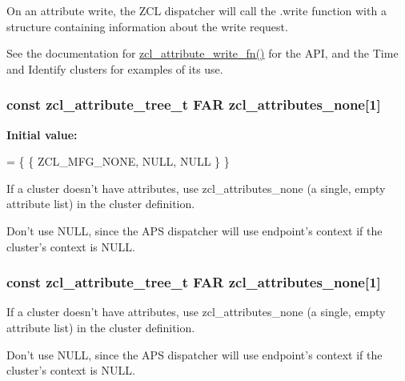 On an attribute write, the Z\-C\-L dispatcher will call the .write function with a structure containing information about the write request. 

See the documentation for \hyperlink{group__zcl_ga9024d6fb96d7fa35d13f7531efe3d6fb}{zcl\-\_\-attribute\-\_\-write\-\_\-fn()} for the A\-P\-I, and the Time and Identify clusters for examples of its use. \hypertarget{group__zcl_gad1e7f7dd501a7ab02f6004e4091c6bea}{
\subsubsection[{zcl\-\_\-attributes\-\_\-none}]{\setlength{\rightskip}{0pt plus 5cm}const {\bf zcl\-\_\-attribute\-\_\-tree\-\_\-t} {\bf F\-A\-R} zcl\-\_\-attributes\-\_\-none\mbox{[}1\mbox{]}}}\label{group__zcl_gad1e7f7dd501a7ab02f6004e4091c6bea}
{\bfseries Initial value\-:}
\begin{DoxyCode}
=
   \{ \{ ZCL\_MFG\_NONE, NULL, NULL \} \}
\end{DoxyCode}


If a cluster doesn't have attributes, use zcl\-\_\-attributes\-\_\-none (a single, empty attribute list) in the cluster definition. 

Don't use N\-U\-L\-L, since the A\-P\-S dispatcher will use endpoint's context if the cluster's context is N\-U\-L\-L. \hypertarget{group__zcl_gad1e7f7dd501a7ab02f6004e4091c6bea}{
\subsubsection[{zcl\-\_\-attributes\-\_\-none}]{\setlength{\rightskip}{0pt plus 5cm}const {\bf zcl\-\_\-attribute\-\_\-tree\-\_\-t} {\bf F\-A\-R} zcl\-\_\-attributes\-\_\-none\mbox{[}1\mbox{]}}}\label{group__zcl_gad1e7f7dd501a7ab02f6004e4091c6bea}


If a cluster doesn't have attributes, use zcl\-\_\-attributes\-\_\-none (a single, empty attribute list) in the cluster definition. 

Don't use N\-U\-L\-L, since the A\-P\-S dispatcher will use endpoint's context if the cluster's context is N\-U\-L\-L. 